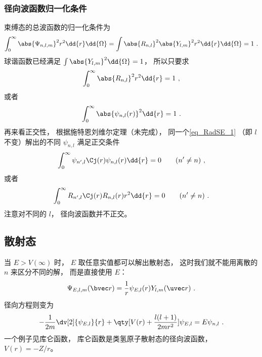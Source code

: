 \subsubsection{径向波函数归一化条件}
束缚态的总波函数的归一化条件为
\begin{equation}
\int_0^\infty \abs{\Psi_{n,l,m}}^2 r^2\dd{r} \dd{\Omega} = \int \abs{R_{n,l}}^2 \abs{Y_{l,m}}^2 r^2\dd{r} \dd{\Omega}  = 1~.
\end{equation}
球谐函数已经满足 $\int \abs{Y_{l,m}}^2 \dd{\Omega} = 1$，  所以只要求
\begin{equation}\label{eq_RadSE_5}
\int_0^\infty \abs{R_{n,l}}^2 r^2 \dd{r}  = 1~,
\end{equation}
或者
\begin{equation}
\int_0^\infty \abs{\psi_{n,l}(r)}^2 \dd{r}  = 1~.
\end{equation}
再来看正交性， 根据施特恩刘维尔定理（未完成）， 同一个\autoref{eq_RadSE_1} （即 $l$ 不变）解出的不同 $\psi_{n,l}$ 满足正交条件
\begin{equation}
\int_0^\infty \psi_{n', l}\Cj(r) \psi_{n,l}(r) \dd{r} = 0 \qquad (n' \ne n)~,
\end{equation}
或者
\begin{equation}\label{eq_RadSE_7}
\int_0^\infty R_{n', l}\Cj(r) R_{n,l}(r) r^2 \dd{r} = 0 \qquad (n' \ne n)~.
\end{equation}
注意对不同的 $l$， 径向波函数并不正交。

\subsection{散射态}
当 $E > V(\infty)$ 时， $E$ 取任意实值都可以解出散射态， 这时我们就不能用离散的 $n$ 来区分不同的解， 而是直接使用 $E$：
\begin{equation}
\Psi_{E, l,m}(\bvec r) = \frac{1}{r}\psi_{E, l}(r) Y_{l,m}(\uvec r)~.
\end{equation}
径向方程则变为
\begin{equation}
-\frac{1}{2m} \dv[2]{\psi_{E, l}}{r} + \qty[V(r) + \frac{l(l + 1)}{2mr^2}]\psi_{E, l} = E \psi_{n, l}~.
\end{equation}
一个例子见库仑函数， 库仑函数是类氢原子散射态的径向波函数， $V(r) = -Z/r$。

